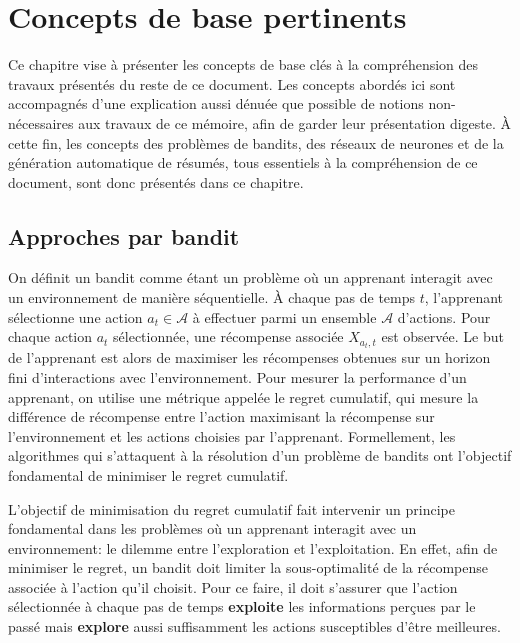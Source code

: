 \chapter{Concepts de base pertinents}     %
\label{chap:prerequis}                   %

Ce chapitre vise à présenter les concepts de base clés à la compréhension des travaux
présentés du reste de ce document.
Les concepts abordés ici sont accompagnés d'une explication aussi dénuée que possible 
de notions non-nécessaires aux travaux de ce mémoire, afin de garder leur présentation
digeste.
À cette fin, les concepts des problèmes de bandits, des réseaux de neurones et de la
génération automatique de résumés, tous essentiels à la compréhension de ce document,
sont donc présentés dans ce chapitre.

\section{Approches par bandit}
\label{sec:bandits}

On définit un bandit \citep{Robbins:1952} comme étant un problème où un 
apprenant interagit avec un environnement de manière séquentielle.
À chaque pas de temps $t$, l'apprenant sélectionne une action $a_t \in \mathcal{A}$ à effectuer 
parmi un ensemble $\mathcal{A}$ d'actions.
Pour chaque action $a_t$ sélectionnée, une récompense associée $X_{a_t,t}$
est observée.
Le but de l'apprenant est alors de maximiser les récompenses obtenues sur un horizon
fini d'interactions avec l'environnement.
Pour mesurer la performance d'un apprenant, on utilise une métrique appelée 
le regret cumulatif, qui mesure la différence de récompense entre l'action maximisant la récompense
sur l'environnement et les actions choisies par l'apprenant.
Formellement, les algorithmes qui s'attaquent à la résolution d'un problème de bandits 
ont l'objectif fondamental de minimiser le regret cumulatif.

L'objectif de minimisation du regret cumulatif fait intervenir un 
principe fondamental dans les problèmes où un apprenant interagit avec 
un environnement: le dilemme entre l'exploration et l'exploitation.
En effet, afin de minimiser le regret, un bandit doit limiter la sous-optimalité de
la récompense associée à l'action qu'il choisit.
Pour ce faire, il doit s'assurer que l'action sélectionnée à chaque 
pas de temps \textbf{exploite} les informations perçues par le passé 
mais \textbf{explore} aussi suffisamment les actions susceptibles 
d'être meilleures.

